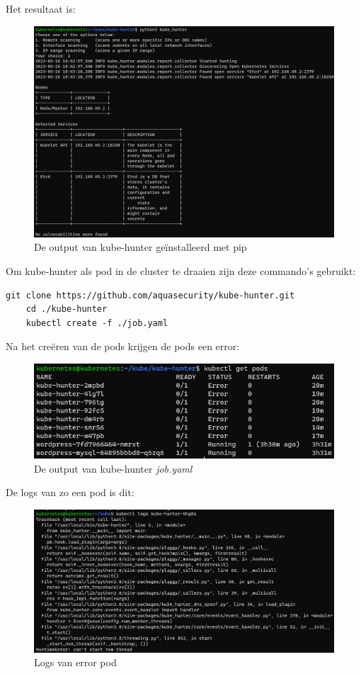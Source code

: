 Het resultaat is:
\begin{flushleft}
    \begin{figure}[h]
        \includegraphics[width=.95\textwidth]{graphics/kubeHunterMachineOutput.png}
        \caption{\label{fig:invalidRequest}De output van kube-hunter geïnstalleerd met pip}
    \end{figure} 
\end{flushleft}

Om kube-hunter als pod in de cluster te draaien zijn deze commando's gebruikt:
\begin{lstlisting}[language=tex, caption={Kube-hunter in een pod draaien}]
    git clone https://github.com/aquasecurity/kube-hunter.git
    cd ./kube-hunter
    kubectl create -f ./job.yaml
\end{lstlisting}

Na het creëren van de pods krijgen de pods een error:
\begin{flushleft}
    \begin{figure}[h]
        \includegraphics[width=.95\textwidth]{graphics/podsError.png}
        \caption{\label{fig:kube-hunterFail}De output van kube-hunter \textit{job.yaml}}
    \end{figure} 
\end{flushleft}

De logs van zo een pod is dit:
\begin{flushleft}
    \begin{figure}[h]
        \includegraphics[width=.95\textwidth]{graphics/errorPods.png}
        \caption{\label{fig:kube-hunterFail}Logs van error pod}
    \end{figure} 
\end{flushleft}


    